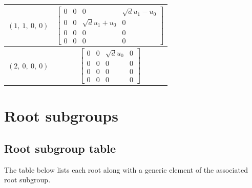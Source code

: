 \documentclass[11pt]{article}
\newcommand{\noi}{\noindent}
\theoremstyle{definition}
\begin{document}
\begin{tabular}{|l|c|}
    \hline
    $\left( 1, \  1, \  0, \  0\right)$ & $\left[\begin{matrix}0 & 0 & 0 & \sqrt{d} u_{1} - u_{0}\\0 & 0 & \sqrt{d} u_{1} + u_{0} & 0\\0 & 0 & 0 & 0\\0 & 0 & 0 & 0\end{matrix}\right]$ \\
    \hline
    $\left( 2, \  0, \  0, \  0\right)$ & $\left[\begin{matrix}0 & 0 & \sqrt{d} u_{0} & 0\\0 & 0 & 0 & 0\\0 & 0 & 0 & 0\\0 & 0 & 0 & 0\end{matrix}\right]$ \\
    \hline
\end{tabular}


\newpage
\section{Root subgroups}

\subsection{Root subgroup table}

\noi The table below lists each root along with a generic element of the associated root subgroup.

\bigskip
\end{document}
